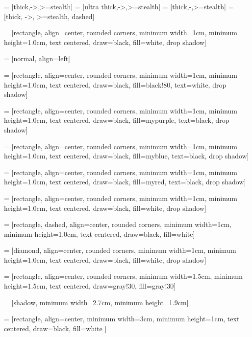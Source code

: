 
 = [thick,->,>=stealth]
 = [ultra thick,->,>=stealth]
 = [thick,-,>=stealth]
 = [thick, ->, >=stealth, dashed]


 = [rectangle, align=center, rounded corners, minimum width=1cm, minimum height=1.0cm, text centered, draw=black, fill=white, drop shadow]

 = [normal, align=left]

 = [rectangle, align=center,  rounded corners, minimum width=1cm, minimum height=1.0cm, text centered, draw=black, fill=black!80, text=white, drop shadow]

 = [rectangle, align=center,  rounded corners, minimum width=1cm, minimum height=1.0cm, text centered, draw=black, fill=mypurple, text=black, drop shadow]

 = [rectangle, align=center,  rounded corners, minimum width=1cm, minimum height=1.0cm, text centered, draw=black, fill=myblue, text=black, drop shadow]

 = [rectangle, align=center,  rounded corners, minimum width=1cm, minimum height=1.0cm, text centered, draw=black, fill=myred, text=black, drop shadow]

 = [rectangle, align=center, rounded corners, minimum width=1cm, minimum height=1.0cm, text centered, draw=black, fill=white, drop shadow]

 = [rectangle, dashed, align=center, rounded corners, minimum width=1cm, minimum height=1.0cm, text centered, draw=black, fill=white]

 = [diamond, align=center, rounded corners, minimum width=1cm, minimum height=1.0cm, text centered, draw=black, fill=white, drop shadow]

 = [rectangle, align=center, rounded corners, minimum width=1.5cm, minimum height=1.5cm, text centered, draw=gray!30, fill=gray!30]

 = [shadow, minimum width=2.7cm, minimum height=1.9cm]

 = [rectangle, align=center, minimum width=3cm, minimum height=1cm, text centered, draw=black, fill=white ]